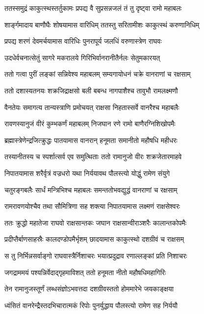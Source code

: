 \twolineshloka
{ततस्समुद्रं काकुत्स्थस्तर्तुकामः प्रपद्य वै}
{सुप्रसन्नजलं तं तु दृष्ट्वा रामो महाबलः}%

\twolineshloka
{शार्ङ्गमादाय बाणौघैः शोषयामास वारिधिम्}
{ततस्तु सरितामीशः काकुत्स्थं करुणानिधिम्}%

\twolineshloka
{प्रपद्य शरणं देवमर्चयामास वारिधिः}
{पुनरापूर्य जलधिं वरुणास्त्रेण राघवः}%

\twolineshloka
{उदधेर्वचनात्सेतुं सागरे मकरालये}
{गिरिभिर्वानरानीतैर्नलः सेतुमकारयत्}%

\twolineshloka
{ततो गत्वा पुरीं लङ्कां सन्निवेश्य महाबलम्}
{सम्यगायोधनं चक्रे वानराणां च रक्षसाम्}%

\twolineshloka
{ततो दशास्यतनयः शक्रजिद्राक्षसो बली}
{बबन्ध नागपाशैश्च तावुभौ रामलक्ष्मणौ}%

\twolineshloka
{वैनतेयः समागत्य तान्यस्त्राणि प्रमोचयत्}
{राक्षसा निहतास्सर्वे वानरैश्च महाबलैः}%

\twolineshloka
{रावणस्यानुजं वीरं कुम्भकर्णं महाबलम्}
{निजघान रणे रामो बाणैरग्निशिखोपमैः}%

\twolineshloka
{ब्रह्मास्त्रेणेन्द्रजित्क्रुद्धः पातयामास वानरान्}
{हनूमता समानीतो महौषधि महीधरः}%

\twolineshloka
{तस्यानीतस्य च स्पर्शात्सर्व एव समुत्थिताः}
{ततो रामानुजो वीरः शक्रजेतारमाहवे}%

\twolineshloka
{निपातयामास शरैर्वृत्रं वज्रधरो यथा}
{निर्ययावथ पौलस्त्यो योद्धुं रामेण संयुगे}%

\twolineshloka
{चतुरङ्गबलैः सार्धं मन्त्रिभिश्च महाबलः}
{समन्ततोभवद्युद्धं वानराणां च रक्षसाम्}%

\twolineshloka
{रामरावणयोश्चैव तथा सौमित्रिणा सह}
{शक्त्या निपातयामास लक्ष्मणं राक्षसेश्वरः}%

\twolineshloka
{ततः क्रुद्धो महातेजा राघवो राक्षसान्तकः}
{जघान राक्षसान्वीराञ्शरैः कालान्तकोपमैः}%

\twolineshloka
{प्रदीप्तैर्बाणसाहस्रैः कालदण्डोपमैर्भृशम्}
{छादयामास काकुत्स्थो दशग्रीवं च राक्षसम्}%

\twolineshloka
{स तु निर्भिन्नसर्वाङ्गो राघवास्त्रैर्निशाचरः}
{भयात्प्रदुद्राव रणाल्लङ्कां प्रति निशाचरः}%

\twolineshloka
{जगद्राममयं पश्यन्निर्वेदाद्गृहमाविशत्}
{ततो हनूमता नीतो महौषधिमहागिरिः}%

\twolineshloka
{तेन रामानुजस्तूर्णं लब्धसंज्ञोऽभवत्तदा}
{दशग्रीवस्ततो होममारेभे जयकाङ्क्षया}%

\twolineshloka
{ध्वंसितं वानरेन्द्रैस्तदभिचारात्मकं रिपोः}
{पुनर्युद्धाय पौलस्त्यो रामेण सह निर्ययौ}%


